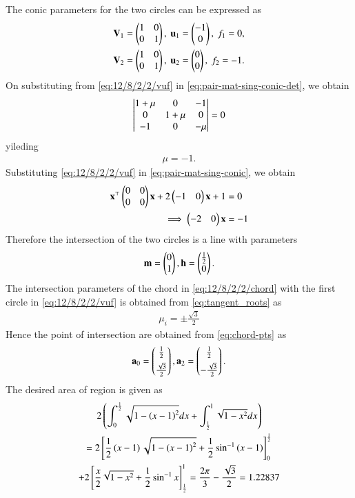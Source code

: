 \documentclass[journal]{IEEEtran}
\begin{document}
The conic parameters for the two circles can be expressed as
\begin{align}
\begin{split}
	\mathbf{V}_1 &= \begin{pmatrix}1&0\\0&1\end{pmatrix},\
	\mathbf{u}_1 = \begin{pmatrix}-1\\0\end{pmatrix},\
	f_1 = 0,
	\\
	\mathbf{V}_2 &= \begin{pmatrix}1&0\\0&1\end{pmatrix},\
	\mathbf{u}_2 = \begin{pmatrix}0\\0\end{pmatrix},\
	f_2 = -1.
\end{split}
	\label{eq:12/8/2/2/vuf}
\end{align}
On substituting from
	\eqref{eq:12/8/2/2/vuf}
	in
	  \eqref{eq:pair-mat-sing-conic-det}, we obtain
\begin{align}
	\begin{vmatrix}1+\mu & 0 & -1 \\ 0 & 1+\mu & 0 \\ -1 & 0 & -\mu\end{vmatrix} = 0
\end{align}
yileding
\begin{align}
	\mu= -1.
\end{align}
Substituting 
	\eqref{eq:12/8/2/2/vuf}
in 
	  \eqref{eq:pair-mat-sing-conic},
	  we obtain
\begin{align}
	\mathbf{x}^\top\begin{pmatrix}0&0\\0&0\end{pmatrix}\mathbf{x} + 2\begin{pmatrix}-1&0\end{pmatrix}\mathbf{x} + 1 &= 0\\
\implies	\begin{pmatrix}-2&0\end{pmatrix}\mathbf{x} &= -1 
\label{eq:12/8/2/2/chord}
\end{align}
Therefore the intersection of the two circles is a line with parameters
\begin{align}
	\mathbf{m} = \begin{pmatrix}0\\1\end{pmatrix},  \mathbf{h} = \begin{pmatrix}\frac{1}{2}\\0\end{pmatrix}.
\end{align}
	The intersection parameters of the 
	chord in 
\eqref{eq:12/8/2/2/chord}
with the 
first circle in \eqref{eq:12/8/2/2/vuf} is obtained from 
\eqref{eq:tangent_roots}
	as
\begin{align}
	\mu_i= \pm\frac{\sqrt{3}}{2}
\end{align}
Hence the point of intersection are
obtained from
	\eqref{eq:chord-pts}
	as
\begin{align}
	\mathbf{a}_0 = \begin{pmatrix}\frac{1}{2}\\[1ex]\frac{\sqrt{3}}{2}\end{pmatrix}, \mathbf{a}_2 = \begin{pmatrix}\frac{1}{2}\\[1ex]-\frac{\sqrt{3}}{2}\end{pmatrix}.
\end{align}
The desired area of region is given as
\begin{multline}
	2\left(\int_{0}^{\frac{1}{2}} \sqrt{1-\left(x-1\right)^2}dx + \int_{\frac{1}{2}}^{1} \sqrt{1-x^2}dx\right)\\
		=2{}\left[\frac{1}{2}\left(x-1\right)\sqrt{1-\left(x-1\right)^2}+\frac{1}{2}\sin^{-1}\left(x-1\right)\right]_{0}^{\frac{1}{2}}\\
		 +2{}\left[\frac{x}{2}\sqrt{1-x^2}+\frac{1}{2}\sin^{-1}x\right]_{\frac{1}{2}}^{1}
	= \frac{2\pi}{3}-\frac{\sqrt{3}}{2}=1.22837
\end{multline}
\end{document}
